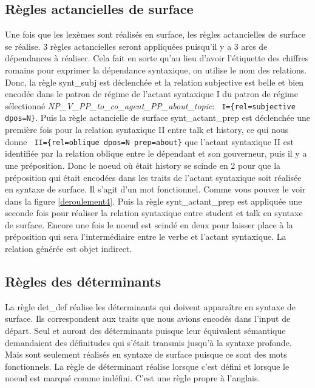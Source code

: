 \subsection{Règles actancielles de surface}
Une fois que les lexèmes sont réalisés en surface, les règles actancielles de surface se réalise. 3 règles actancielles seront appliquées puisqu'il y a 3 arcs de dépendances à réaliser. Cela fait en sorte qu'au lieu d'avoir l'étiquette des chiffres romains pour exprimer la dépendance syntaxique, on utilise le nom des relations. Donc, la règle synt\_subj est déclenchée et la relation subjective est belle et bien encodée dans le patron de régime de l'actant syntaxique I du patron de régime sélectionné \emph{NP\_V\_PP\_to\_co\_agent\_PP\_about\_topic}: \lstinline! I={rel=subjective dpos=N}!. Puis la règle actancielle de surface synt\_actant\_prep est déclenchée une première fois pour la relation syntaxique II entre talk et history, ce qui nous donne \lstinline! II={rel=oblique dpos=N prep=about}! que l'actant syntaxique II est identifiée par la relation oblique entre le dépendant et son gouverneur, puis il y a une préposition. Donc le noeud où était history se scinde en 2 pour que la préposition qui était encodées dans les traits de l'actant syntaxique soit réalisée en syntaxe de surface. Il s'agit d'un mot fonctionnel. Comme vous pouvez le voir dans la figure \ref{deroulement4}. Puis la règle synt\_actant\_prep est appliquée une seconde fois pour réaliser la relation syntaxique entre student et talk en syntaxe de surface. Encore une fois le noeud est scindé en deux pour laisser place à la préposition  qui sera l'intermédiaire entre le verbe et l'actant syntaxique. La relation générée est objet indirect.

\subsection{Règles des déterminants}
La règle det\_def réalise les déterminants qui doivent apparaître en syntaxe de surface. Ils correspondent aux traits que nous avions encodés dans l'input de départ. Seul  et  auront des déterminants puisque leur équivalent sémantique demandaient des définitudes qui s'était transmis jusqu'à la syntaxe profonde. Mais sont seulement réalisés en syntaxe de surface puisque ce sont des mots fonctionnels. La règle de déterminant réalise  lorsque c'est défini et  lorsque le noeud est marqué comme indéfini. C'est une règle propre à l'anglais.

